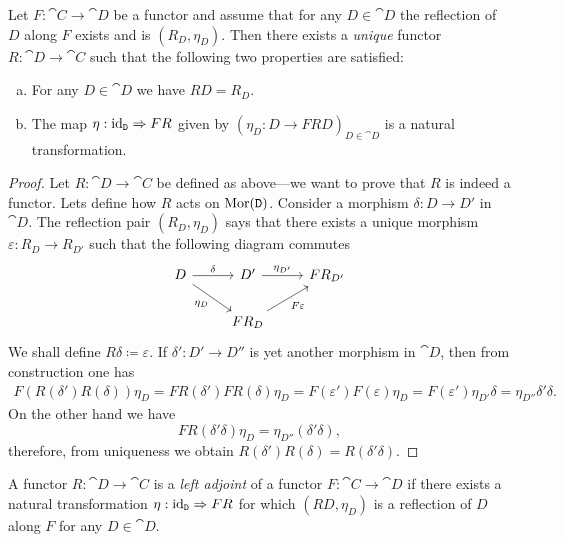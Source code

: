 \begin{proposition}
\label{prop:reflection-as-func-and-unit-as-nat-tranf}
Let \(F: \cat C \to \cat D\) be a functor and assume that for any \(D \in \cat D\)
the reflection of \(D\) along \(F\) exists and is \((R_D, \eta_D)\). Then there
exists a \emph{unique} functor \(R: \cat D \to \cat C\) such that the following
two properties are satisfied:
\begin{enumerate}[(a)]\setlength\itemsep{0em}
\item For any \(D \in \cat D\) we have \(R D = R_D\).

\item The map \(\eta: \operatorname{id}_{\texttt D} \Rightarrow F R\) given by
  \((\eta_D: D \to F R D)_{D \in \cat D}\) is a natural transformation.
\end{enumerate}
\end{proposition}

\begin{proof}
Let \(R: \cat D \to \cat C\) be defined as above---we want to prove that \(R\) is
indeed a functor. Lets define how \(R\) acts on \(\operatorname{Mor}(\texttt D)\). Consider a
morphism \(\delta: D \to D'\) in \(\cat D\). The reflection pair
\((R_D, \eta_D)\) says that there exists a unique morphism
\(\varepsilon: R_D \to R_{D'}\) such that the following diagram commutes
\[
\begin{tikzcd}
D \ar[r, "\delta"] \ar[rd, "\eta_D"']
&D' \ar[r, "\eta_{D'}"]
&F R_{D'}
\\
& F R_D \ar[ru, "F \varepsilon"']
&
\end{tikzcd}
\]
We shall define \(R \delta \coloneq \varepsilon\). If \(\delta': D' \to D''\) is yet another morphism in
\(\cat D\), then from construction one has
\begin{align*}
  F(R(\delta') R(\delta)) \eta_D
  = F R(\delta') F R(\delta) \eta_D
  = F(\varepsilon') F(\varepsilon) \eta_D
  = F(\varepsilon') \eta_{D'} \delta
  = \eta_{D''} \delta' \delta.
\end{align*}
On the other hand we have
\[
F R(\delta' \delta) \eta_D = \eta_{D''} (\delta' \delta),
\]
therefore, from uniqueness we obtain \(R(\delta') R(\delta) = R(\delta' \delta)\).
\end{proof}

\begin{definition}
\label{def:left-adjoint}
A functor \(R: \cat D \to \cat C\) is a \emph{left adjoint} of a functor
\(F: \cat C \to \cat D\) if there exists a natural transformation
\(\eta: \operatorname{id}_{\texttt D} \Rightarrow F R\) for which \((R D, \eta_D)\) is a reflection of
\(D\) along \(F\) for any \(D \in \cat D\).
\end{definition}

